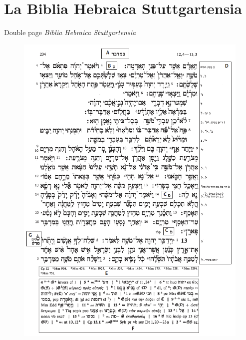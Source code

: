 \documentclass[11pt]{beamer}
\begin{document}
\begin{frame}
	\titlepage
\end{frame}

\section{La Biblia Hebraica Stuttgartensia}

\begin{frame}{Double page \textit{Biblia Hebraica Stuttgartensia}}
\begin{minipage}{.45\textwidth}
    \begin{figure}
        \centering
        \includegraphics[width=1\linewidth]{img/BHSverso.png}
    \end{figure}
\end{minipage}
\hfill
\begin{minipage}{.45\textwidth}
    \begin{figure}

\end{figure}
\end{minipage}
\end{frame}
\end{document}
